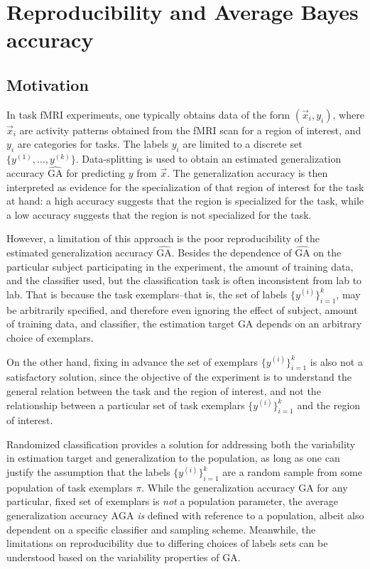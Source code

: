 \section{Reproducibility and Average Bayes accuracy}\label{sec:average_bayes_accuracy}

\subsection{Motivation}

In task fMRI experiments, one typically obtains data of the form
$(\vec{x}_i, y_i)$, where $\vec{x}_i$ are activity patterns obtained
from the fMRI scan for a region of interest, and $y_i$ are categories
for tasks.  The labels $y_i$ are limited to a discrete set
$\{y^{(1)},\hdots, y^{(k)}\}$.  Data-splitting is used to obtain an
estimated generalization accuracy $\hat{\text{GA}}$ for predicting $y$
from $\vec{x}$.  The generalization accuracy is then interpreted as
evidence for the specialization of that region of interest for the
task at hand: a high accuracy suggests that the region is specialized
for the task, while a low accuracy suggests that the region is not
specialized for the task.

However, a limitation of this approach is the poor reproducibility of
the estimated generalization accuracy $\hat{\text{GA}}$.  Besides the
dependence of $\hat{\text{GA}}$ on the particular subject
participating in the experiment, the amount of training data, and the
classifier used, but the classification task is often inconsistent
from lab to lab.  That is because the task exemplars--that is, the set
of labels $\{y^{(i)}\}_{i=1}^k$, may be arbitrarily specified, and
therefore even ignoring the effect of subject, amount of training
data, and classifier, the estimation target $\text{GA}$ depends on
an arbitrary choice of exemplars.

On the other hand, fixing in advance the set of exemplars
$\{y^{(i)}\}_{i=1}^k$ is also not a satisfactory solution, since the
objective of the experiment is to understand the general relation
between the task and the region of interest, and not the relationship
between a particular set of task exemplars $\{y^{(i)}\}_{i=1}^k$ and
the region of interest.

Randomized classification provides a solution for addressing both the
variability in estimation target and generalization to the population,
as long as one can justify the assumption that the labels
$\{y^{(i)}\}_{i=1}^k$ are a random sample from some population of task
exemplars $\pi$.  While the generalization accuracy $\text{GA}$ for
any particular, fixed set of exemplars is \emph{not} a population
parameter, the average generalization accuracy $\text{AGA}$ \emph{is}
defined with reference to a population, albeit also dependent on a
specific classifier and sampling scheme.  Meanwhile, the limitations
on reproducibility due to differing choices of labels sets can be
understood based on the variability properties of $\text{GA}$.

